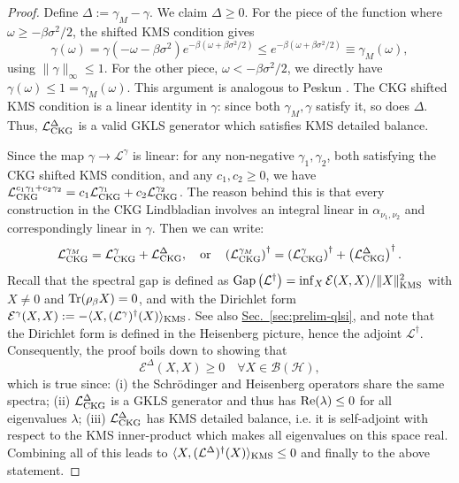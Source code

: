 \begin{proof}
    Define $\Delta := \gamma_M - \gamma$. We claim $\Delta \geq 0$. For the piece of the function where $\omega \geq -\beta\sigma^2 / 2$, the shifted KMS condition gives
    $$
    \gamma(\omega) = \gamma(-\omega - \beta\sigma^2)e^{-\beta(\omega + \beta\sigma^2/2)} \leq e^{-\beta(\omega + \beta\sigma^2 / 2)} \equiv \gamma_M(\omega),
    $$
    using $\|\gamma\|_\infty \leq 1$. For the other piece, $\omega < -\beta\sigma^2/2$, we directly have $\gamma(\omega) \leq 1 = \gamma_M(\omega)$. This argument is analogous to Peskun \cite{peskun1973optimum}. The CKG shifted KMS condition is a linear identity in $\gamma$: since both $\gamma_M, \gamma$ satisfy it, so does $\Delta$. Thus, $\mathcal{L}_\textup{CKG}^\Delta$ is a valid GKLS generator which satisfies KMS detailed balance.

    Since the map $\gamma\rightarrow\mathcal{L}^\gamma$ is linear: for any non-negative $\gamma_1, \gamma_2$, both satisfying the CKG shifted KMS condition, and any $c_1, c_2 \geq 0$, we have $\mathcal{L}_\textup{CKG}^{c_1\gamma_1 + c_2\gamma_2} = c_1 \mathcal{L}_\textup{CKG}^{\gamma_1} + c_2 \mathcal{L}_\textup{CKG}^{\gamma_2}$. The reason behind this is that every construction in the CKG Lindbladian involves an integral linear in $\alpha_{\nu_1, \nu_2}$ and correspondingly linear in $\gamma$. Then we can write: $$\mathcal{L}_\textup{CKG}^{\gamma_M} = \mathcal{L}_\textup{CKG}^\gamma + \mathcal{L}_\textup{CKG}^\Delta, 
    \quad\textup{or}\quad
     \left(\mathcal{L}_\textup{CKG}^{\gamma_M}\right)^\dagger = \left(\mathcal{L}_\textup{CKG}^\gamma\right)^\dagger + \left(\mathcal{L}_\textup{CKG}^\Delta\right)^\dagger.$$
    Recall that the spectral gap is defined as
    $\textup{Gap}\left(\mathcal{L}^\dagger\right) = \inf_{X} \mathcal{E}(X, X) / \|X\|^2_\textup{KMS}$ with $X\neq 0$ and $\operatorname{Tr}(\rho_\beta X) = 0$, and with the Dirichlet form $\mathcal{E}^\gamma(X, X) := -\langle X, (\mathcal{L}^\gamma)^\dagger(X) \rangle_\textup{KMS}$. See also \hyperref[sec:prelim-qlsi]{Sec.~\ref*{sec:prelim-qlsi}}, and note that the Dirichlet form is defined in the Heisenberg picture, hence the adjoint $\mathcal{L}^\dagger$. Consequently, the proof boils down to showing that $$\mathcal{E}^\Delta(X, X) \geq 0 \quad\forall X \in \mathcal{B(H)},$$
    which is true since: (i) the Schrödinger and Heisenberg operators share the same spectra; (ii) $\mathcal{L}_\textup{CKG}^\Delta$ is a GKLS generator and thus has $\textup{Re}(\lambda) \leq 0$ for all eigenvalues $\lambda$; (iii) $\mathcal{L}_\textup{CKG}^\Delta$ has KMS detailed balance, i.e. it is self-adjoint with respect to the KMS inner-product which makes all eigenvalues on this space real. Combining all of this leads to $\langle X, (\mathcal{L}^\Delta)^\dagger(X) \rangle_\textup{KMS} \leq 0$ and finally to the above statement.
    

\end{proof}
